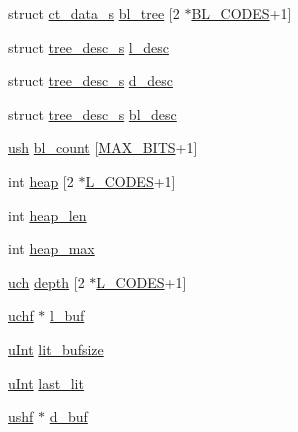 \begin{DoxyCompactItemize}
\item 
struct \hyperlink{structct__data__s}{ct\+\_\+data\+\_\+s} \hyperlink{structinternal__state_a98131fc5b64d0d7542bc3621aef19854}{bl\+\_\+tree} \mbox{[}2 $\ast$\hyperlink{deflate_8h_a9e19158a493307d4f211cdf223da8319}{B\+L\+\_\+\+C\+O\+D\+ES}+1\mbox{]}
\item 
struct \hyperlink{structtree__desc__s}{tree\+\_\+desc\+\_\+s} \hyperlink{structinternal__state_a0266c4e0250652904e6b4908d8da84a9}{l\+\_\+desc}
\item 
struct \hyperlink{structtree__desc__s}{tree\+\_\+desc\+\_\+s} \hyperlink{structinternal__state_ab2fddb383d3055b6ec81c7fef14e99d8}{d\+\_\+desc}
\item 
struct \hyperlink{structtree__desc__s}{tree\+\_\+desc\+\_\+s} \hyperlink{structinternal__state_aa0e5da102c35a7e7d22dd1894039393b}{bl\+\_\+desc}
\item 
\hyperlink{zutil_8h_a3754180d606d4ed15468d15d9665aa2e}{ush} \hyperlink{structinternal__state_abf9e786c8e5b4ab5d620ab123208034c}{bl\+\_\+count} \mbox{[}\hyperlink{deflate_8h_a51c241e7ad52441b8d4c1fd5f498b3b9}{M\+A\+X\+\_\+\+B\+I\+TS}+1\mbox{]}
\item 
int \hyperlink{structinternal__state_ad7edb9b1d387e631bc6fde1cad0af758}{heap} \mbox{[}2 $\ast$\hyperlink{deflate_8h_a2b0cc00cc6a7d521fba8d208a1cae477}{L\+\_\+\+C\+O\+D\+ES}+1\mbox{]}
\item 
int \hyperlink{structinternal__state_a0659e23b0188ac16db58f98ae2b67b6b}{heap\+\_\+len}
\item 
int \hyperlink{structinternal__state_aa8c78bbfa5d71f3ccc55445a62897f47}{heap\+\_\+max}
\item 
\hyperlink{zutil_8h_af3307af5922c72924a837559c801a8a4}{uch} \hyperlink{structinternal__state_a8e525b4f3dfa38b3bbcb8b427e333570}{depth} \mbox{[}2 $\ast$\hyperlink{deflate_8h_a2b0cc00cc6a7d521fba8d208a1cae477}{L\+\_\+\+C\+O\+D\+ES}+1\mbox{]}
\item 
\hyperlink{zutil_8h_aaa6fdf02a2fdaf3731f17a19920ddb0b}{uchf} $\ast$ \hyperlink{structinternal__state_a5e6c4269e29696b192e02fd01381e400}{l\+\_\+buf}
\item 
\hyperlink{zconf_8h_a87d141052bcd5ec8a80812a565c70369}{u\+Int} \hyperlink{structinternal__state_a25ad7fc0094e412144b4201df2126bbb}{lit\+\_\+bufsize}
\item 
\hyperlink{zconf_8h_a87d141052bcd5ec8a80812a565c70369}{u\+Int} \hyperlink{structinternal__state_a01689001a8f8c7dfa46a439b7ae0708a}{last\+\_\+lit}
\item 
\hyperlink{zutil_8h_ab854e4722acf30ada8a7a71b58d1b238}{ushf} $\ast$ \hyperlink{structinternal__state_ac636c34c1c08dc9d2f9c199ce2caa99d}{d\+\_\+buf}

\end{DoxyCompactItemize}
